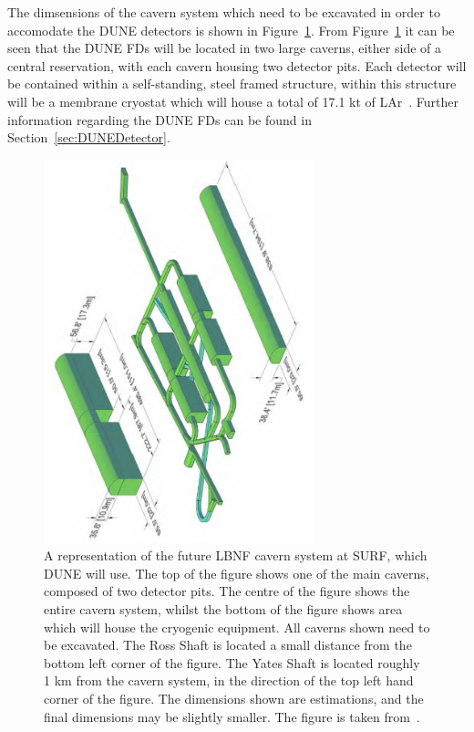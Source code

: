 The dimsensions of the cavern system which need to be excavated in order to accomodate the DUNE detectors is shown in Figure~\ref{fig:DUNECavernSystem}. From Figure~\ref{fig:DUNECavernSystem} it can be seen that the DUNE FDs will be located in two large caverns, either side of a central reservation, with each cavern housing two detector pits. Each detector will be contained within a self-standing, steel framed structure, within this structure will be a membrane cryostat which will house a total of 17.1 kt of LAr~\citep{DUNECDR_V1}. Further information regarding the DUNE FDs can be found in Section~\ref{sec:DUNEDetector}. \\

\begin{figure}[h!]
  \centering
  \includegraphics[width=0.7\textwidth]{DUNECavernSystem}
  \caption[A representation of the future LBNF cavern system at SURF, which DUNE will use]
          {A representation of the future LBNF cavern system at SURF, which DUNE will use. The top of the figure shows one of the main caverns, composed of two detector pits. The centre of the figure shows the entire cavern system, whilst the bottom of the figure shows area which will house the cryogenic equipment. All caverns shown need to be excavated. The Ross Shaft is located a small distance from the bottom left corner of the figure. The Yates Shaft is located roughly 1 km from the cavern system, in the direction of the top left hand corner of the figure. The dimensions shown are estimations, and the final dimensions may be slightly smaller. The figure is taken from~\citep{DUNECDR_V3}.}
  \label{fig:DUNECavernSystem}
\end{figure}

